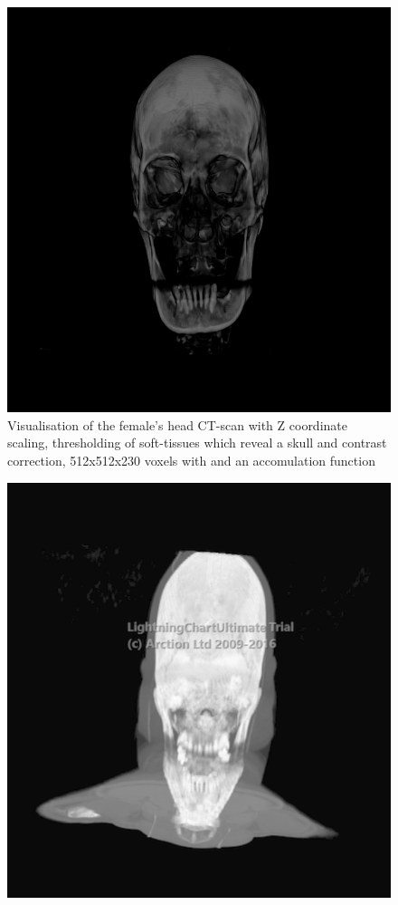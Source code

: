 \documentclass[twoside, english, 11pt]{report}
\begin{document}
\begin{figure}[!h]
\centerline{\includegraphics[scale = 0.6]{img/head-th-win}}
\caption{Visualisation of the female's head CT-scan with Z coordinate scaling, thresholding of soft-tissues which reveal a skull and contrast correction, 512x512x230 voxels with and an accomulation function\label{fig:head-th-win}}
\end{figure}\begin{figure}[!h]
\centerline{\includegraphics[scale = 0.45]{img/maxi}}

\end{figure}
\end{document}
